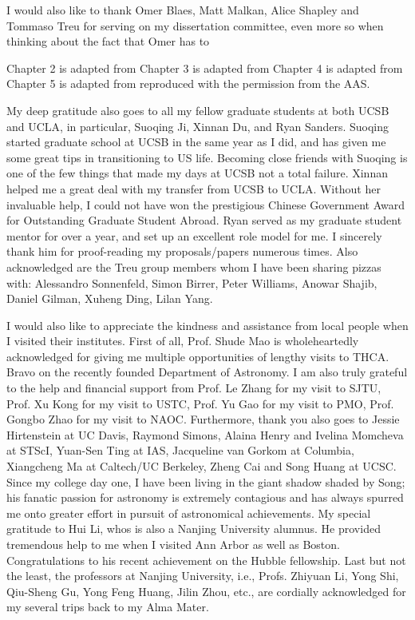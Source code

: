 I would also like to thank Omer Blaes, Matt Malkan, Alice Shapley and Tommaso Treu for serving on my dissertation
committee,
even more so when thinking about the fact that Omer has to 

Chapter 2 is adapted from
Chapter 3 is adapted from
Chapter 4 is adapted from
Chapter 5 is adapted from
reproduced with the permission from the AAS.


My deep gratitude also goes to all my fellow graduate students at both UCSB and UCLA, in particular, Suoqing Ji,
Xinnan Du, and Ryan Sanders.
Suoqing started graduate school at UCSB in the same year as I did, and has given me some great tips in
transitioning to US life.
Becoming close friends with Suoqing is one of the few things that made my days at UCSB not a total failure.
Xinnan helped me a great deal with my transfer from UCSB to UCLA.
Without her invaluable help, I could not have won the prestigious Chinese Government Award for Outstanding
Graduate Student Abroad.
Ryan served as my graduate student mentor for over a year, and set up an excellent role model for me.
I sincerely thank him for proof-reading my proposals/papers numerous times.
Also acknowledged are the Treu group members whom I have been sharing pizzas with:
Alessandro Sonnenfeld, Simon Birrer, Peter Williams, Anowar Shajib, Daniel Gilman, Xuheng Ding, Lilan Yang.

I would also like to appreciate the kindness and assistance from local people when I visited their institutes.
First of all, Prof. Shude Mao is wholeheartedly acknowledged for giving me multiple opportunities of lengthy visits to THCA.
Bravo on the recently founded Department of Astronomy.
I am also truly grateful to the help and financial support from Prof. Le Zhang for my visit to SJTU, 
Prof. Xu Kong for my visit to USTC, Prof. Yu Gao for my visit to PMO, Prof. Gongbo Zhao for my visit to NAOC.
Furthermore, thank you also goes to Jessie Hirtenstein at UC Davis,
Raymond Simons, Alaina Henry and Ivelina Momcheva at STScI,
Yuan-Sen Ting at IAS,
Jacqueline van Gorkom at Columbia,
Xiangcheng Ma at Caltech/UC Berkeley,
Zheng Cai and Song Huang at UCSC.
Since my college day one, I have been living in the giant shadow shaded by Song; 
his fanatic passion for astronomy is extremely contagious and has always spurred me onto greater effort in
pursuit of astronomical achievements.
My special gratitude to Hui Li, whos is also a Nanjing University alumnus.
He provided tremendous help to me when I visited Ann Arbor as well as Boston.
Congratulations to his recent achievement on the Hubble fellowship.
Last but not the least, the professors at Nanjing University, i.e., Profs. Zhiyuan Li, Yong Shi, Qiu-Sheng Gu,
Yong Feng Huang, Jilin Zhou, etc., are cordially acknowledged for my several trips back to my Alma Mater.


